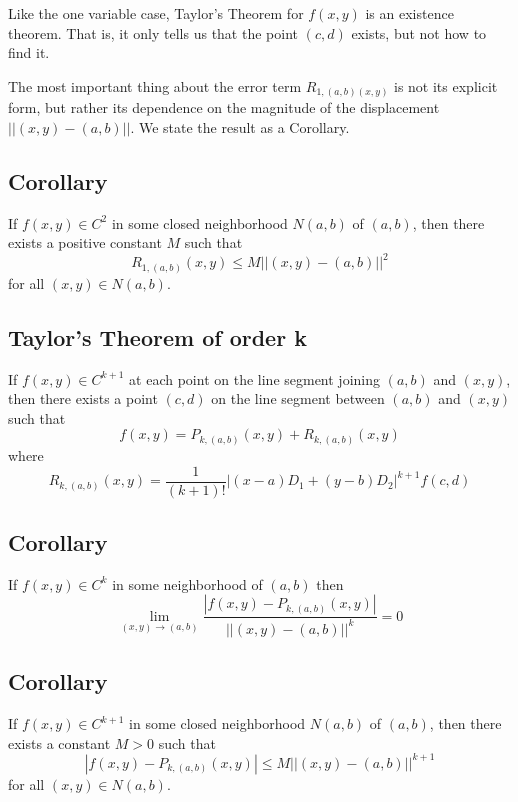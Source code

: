 \begin{remark}
    Like the one variable case, Taylor's Theorem for $ f(x,y) $ is an
    existence theorem. That is, it only tells us that the point $ (c,d) $
    exists, but not how to find it.
\end{remark}

\begin{remark}
    The most important thing about the error term $ R_{1,(a,b)(x,y)} $ is not
    its explicit form, but rather its dependence on the magnitude of the 
    displacement $ ||(x,y)−(a,b)|| $. We state the result as a Corollary.
\end{remark}

\begin{thmbox}
\subsection{Corollary}
If $ f(x,y)\in C^2 $ in some closed neighborhood
$ N(a,b) $ of $ (a,b) $, then there exists a positive constant
$ M $ such that
\[ R_{1,(a,b)}(x,y)\le M||(x,y)-(a,b)||^2 \]
for all $ (x,y)\in N(a,b) $.
\end{thmbox}

\begin{thmbox}
\subsection{Taylor's Theorem of order k}
If $ f(x,y)\in C^{k+1} $ at each point on the line segment
joining $ (a,b) $ and $ (x,y) $, then there exists
a point $ (c,d) $ on the line segment between $ (a,b) $ and
$ (x,y) $ such that
\[ f(x,y)=P_{k,(a,b)}(x,y)+R_{k,(a,b)}(x,y) \]
where
\[ R_{k,(a,b)}(x,y)=\frac{1}{(k+1)!}
    |(x-a)D_1+(y-b)D_2|^{k+1}f(c,d)\]
\end{thmbox}

\begin{thmbox}
\subsection{Corollary}
If $ f(x,y)\in C^k $ in some neighborhood of
$ (a,b) $ then
\[ \lim\limits_{{(x,y)} \to {(a,b)}} 
\frac{|f(x,y)-P_{k,(a,b)}(x,y)|}{||(x,y)-(a,b)||^k}=0  \]
\end{thmbox}

\begin{thmbox}
\subsection{Corollary}
If $ f(x,y)\in C^{k+1} $ in some closed neighborhood
$ N(a,b) $ of $ (a,b) $, then there exists a constant
$ M>0 $ such that
\[ |f(x,y)-P_{k,(a,b)}(x,y)|\le M||(x,y)-(a,b)||^{k+1} \]
for all $ (x,y)\in N(a,b) $.
\end{thmbox}